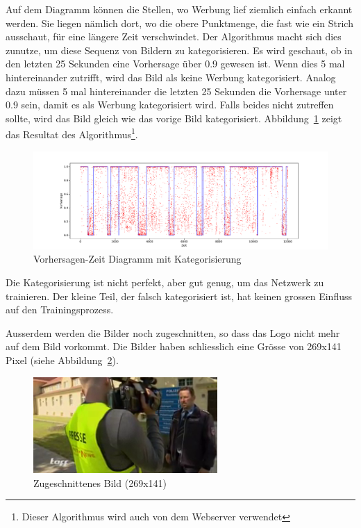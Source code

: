 \documentclass[12pt,a4paper]{report}
\begin{document}
Auf dem Diagramm können die Stellen, wo Werbung lief ziemlich einfach erkannt werden.
Sie liegen nämlich dort, wo die obere Punktmenge, die fast wie ein Strich ausschaut, für eine längere Zeit verschwindet.
Der Algorithmus macht sich dies zunutze, um diese Sequenz von Bildern zu kategorisieren.
Es wird geschaut, ob in den letzten 25 Sekunden eine Vorhersage über 0.9 gewesen ist.
Wenn dies 5 mal hintereinander zutrifft, wird das Bild als keine Werbung kategorisiert.
Analog dazu müssen 5 mal hintereinander die letzten 25 Sekunden die Vorhersage unter 0.9 sein,
damit es als Werbung kategorisiert wird.
Falls beides nicht zutreffen sollte, wird das Bild gleich wie das vorige Bild kategorisiert.
Abbildung~\ref{fig:points_line} zeigt das Resultat des Algorithmus\footnote{Dieser Algorithmus wird auch von dem Webserver verwendet}.
\begin{figure}[h]%
    \centering
    \includegraphics[width=1.0\textwidth]{assets/python/points_blue_line.pdf}%
    \caption{Vorhersagen-Zeit Diagramm mit Kategorisierung}%
    \label{fig:points_line}%
\end{figure}
Die Kategorisierung ist nicht perfekt, aber gut genug, um das Netzwerk zu trainieren.
Der kleine Teil, der falsch kategorisiert ist, hat keinen grossen Einfluss auf den Trainingsprozess.

Ausserdem werden die Bilder noch zugeschnitten, so dass das Logo nicht mehr auf dem Bild vorkommt.
Die Bilder haben schliesslich eine Grösse von 269x141 Pixel (siehe Abbildung~\ref{fig:cropped_img}).
\begin{figure}[h]%
    \centering
    \includegraphics[width=7cm]{assets/images/cropped.png}%
    \caption{Zugeschnittenes Bild (269x141)}%
    \label{fig:cropped_img}%
\end{figure}
\end{document}

